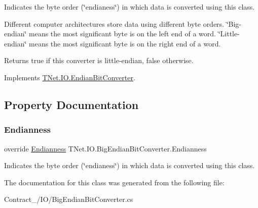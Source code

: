 Indicates the byte order (\char`\"{}endianess\char`\"{}) in which data is converted using this class. 

Different computer architectures store data using different byte orders. \char`\"{}\+Big-\/endian\char`\"{} means the most significant byte is on the left end of a word. \char`\"{}\+Little-\/endian\char`\"{} means the most significant byte is on the right end of a word. 

\begin{DoxyReturn}{Returns}
true if this converter is little-\/endian, false otherwise.
\end{DoxyReturn}


Implements \mbox{\hyperlink{class_t_net_1_1_i_o_1_1_endian_bit_converter_a0fe24cd850d8da0da9f75ef0467551cb}{T\+Net.\+I\+O.\+Endian\+Bit\+Converter}}.



\subsection{Property Documentation}
\mbox{\label{class_t_net_1_1_i_o_1_1_big_endian_bit_converter_a2bb1043e1dd56349111dcf2b20169063}} 
\subsubsection{\texorpdfstring{Endianness}{Endianness}}
{\footnotesize\ttfamily override \mbox{\hyperlink{namespace_t_net_1_1_i_o_afd413ccca7a2b11b5a201325685881dc}{Endianness}} T\+Net.\+I\+O.\+Big\+Endian\+Bit\+Converter.\+Endianness\hspace{0.3cm}{\ttfamily [get]}}



Indicates the byte order (\char`\"{}endianess\char`\"{}) in which data is converted using this class. 



The documentation for this class was generated from the following file\+:\begin{DoxyCompactItemize}
\item 
Contract\+\_\+/\+I\+O/Big\+Endian\+Bit\+Converter.\+cs\end{DoxyCompactItemize}
